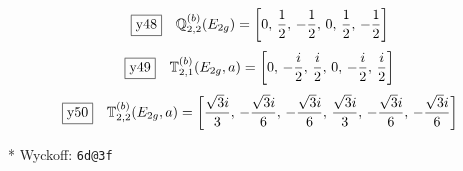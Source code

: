 \documentclass[fleqn,10pt,landscape]{jsarticle}
\begin{document}
\begin{dmath*}
\fbox{y48}\quad \mathbb{Q}_{2,2}^{(b)}(E_{2g})=\left[ 0,\, \frac{1}{2},\, - \frac{1}{2},\, 0,\, \frac{1}{2},\, - \frac{1}{2} \right]
\end{dmath*}
\begin{dmath*}
\fbox{y49}\quad \mathbb{T}_{2,1}^{(b)}(E_{2g},a)=\left[ 0,\, - \frac{i}{2},\, \frac{i}{2},\, 0,\, - \frac{i}{2},\, \frac{i}{2} \right]
\end{dmath*}
\begin{dmath*}
\fbox{y50}\quad \mathbb{T}_{2,2}^{(b)}(E_{2g},a)=\left[ \frac{\sqrt{3} i}{3},\, - \frac{\sqrt{3} i}{6},\, - \frac{\sqrt{3} i}{6},\, \frac{\sqrt{3} i}{3},\, - \frac{\sqrt{3} i}{6},\, - \frac{\sqrt{3} i}{6} \right]
\end{dmath*}
\vspace{5mm}

\noindent ** Wyckoff: \texttt{6d@3f}
\end{document}
